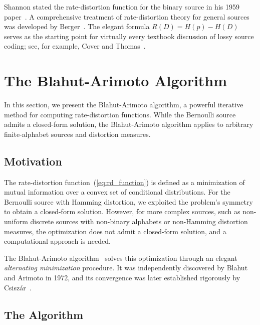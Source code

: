 \documentclass[11pt]{article}
\newcommand{\RD}{R(D)}
\newcommand{\Hp}{H(p)}
\newcommand{\HD}{H(D)}
\begin{document}
Shannon stated the rate-distortion function for the binary source in his 1959
paper~\cite{shannon1959}.
A comprehensive treatment of rate-distortion theory for general sources was
developed by Berger~\cite{berger1971}.
The elegant formula $\RD = \Hp - \HD$ serves as the starting point for
virtually every textbook discussion of lossy source coding; see, for
example, Cover and Thomas~\cite{cover2006}.


\section{The Blahut-Arimoto Algorithm}
\label{sec:blahut_arimoto}

In this section, we present the Blahut-Arimoto algorithm, a powerful iterative
method for computing rate-distortion functions.
While the Bernoulli source admits a closed-form solution, the Blahut-Arimoto
algorithm applies to arbitrary finite-alphabet sources and distortion measures.

\subsection{Motivation}
\label{subsec:ba_motivation}

The rate-distortion function~(\ref{eq:rd_function}) is defined as a minimization
of mutual information over a convex set of conditional distributions.
For the Bernoulli source with Hamming distortion, we exploited the problem's
symmetry to obtain a closed-form solution.
However, for more complex sources, such as non-uniform discrete sources with
non-binary alphabets or non-Hamming distortion measures, the optimization
does not admit a closed-form solution, and a computational approach is needed.

The Blahut-Arimoto algorithm~\cite{blahut1972,arimoto1972} solves this
optimization through an elegant \emph{alternating minimization} procedure.
It was independently discovered by Blahut and Arimoto in 1972, and its
convergence was later established rigorously by Csisz\'{a}r~\cite{csiszar1974}.

\subsection{The Algorithm}
\label{subsec:ba_algorithm}
\end{document}
